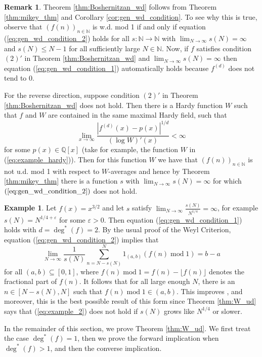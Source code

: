 \documentclass[12pt]{article}
\theoremstyle{plain} %
\theoremstyle{definition} %
\newtheorem{remark}[theorem]{Remark}
\newtheorem{example}[theorem]{Example}
\theoremstyle{plain}
\theoremstyle{plain}
\numberwithin{equation}{section}
\newcommand{\N}{\mathbb{N}}
\newcommand{\Q}{\mathbb{Q}}
\renewcommand{\epsilon}{\varepsilon}
\renewcommand{\leq}{\leqslant}
\renewcommand{\subset}{\subseteq}
\newcommand{\1}{\mathbbm{1}}
\newcommand{\oo}{\infty}
\renewcommand{\mod}{\operatorname{mod}}
\begin{document}
\begin{remark}
Theorem \ref{thm:Boshernitzan_wd} follows from Theorem \ref{thm:mikey_thm} and Corollary \ref{cor:gen_wd_condition}. To see why this is true, observe that  $(f(n))_{n\in \N}$ is w.d. mod 1 if and only if equation (\ref{eq:gen_wd_condition_2}) holds for all $s:\N\rightarrow \N$ with $\lim_{N\to\oo}s(N)=\oo$ and $s(N)\leq N-1$ for all sufficiently large $N\in \N$. Now, if $f$ satisfies condition $(2)'$ in Theorem \ref{thm:Boshernitzan_wd} and $\lim_{N\to\oo}s(N)=\oo$ then equation (\ref{eq:gen_wd_condition_1}) automatically holds because $f^{(d)}$ does not tend to $0$. 


For the reverse direction, suppose condition $(2)'$ in Theorem \ref{thm:Boshernitzan_wd} does not hold. Then there is a Hardy function $W$ such that $f$ and $W$ are contained in the same maximal Hardy field, such that 
\[
\lim_{x\to\oo}\frac{|f^{(d)}(x)-p(x)|^{1/d}}{(\log W)'(x)}<\oo
\]
for some $p(x)\in \Q[x]$ (take for example, the function $W$ in (\ref{eq:example_hardy})). Then for this function $W$ we have that $(f(n))_{n\in \N}$ is not u.d. mod 1 with respect to $W$-averages and hence by Theorem \ref{thm:mikey_thm} there is a function $s$ with $\lim_{N\to\oo}s(N)=\oo$ for which $(\ref{eq:gen_wd_condition_2})$ does not hold.
\end{remark}

\begin{example}
Let $f(x) = x^{3/2}$ and let $s$ satisfy $\lim_{N\to\oo}\frac{s(N)}{N^{1/4}}=\oo$, for example $s(N)=N^{1/4+\epsilon}$ for some $\epsilon>0$. Then equation (\ref{eq:gen_wd_condition_1}) holds with $d=\deg^*(f)=2$. By the usual proof of the Weyl Criterion, equation (\ref{eq:gen_wd_condition_2}) implies that 
\begin{equation}\label{eq:example_2}
         \lim_{N\to\oo}\frac{1}{s(N)}\sum_{n=N-s(N)}^N1_{(a,b)}(f(n)\mod 1) = b-a
\end{equation}
         for all $(a,b)\subset [0,1]$, where $f(n)\mod 1 = f(n)-\lfloor f(n)\rfloor$ denotes the fractional part of $f(n)$. It follows that for all large enough $N$, there is an $n\in [N-s(N),N]$ such that $f(n)\mod 1\in (a,b)$. This improves \cite[Example 1.10]{reilly26}, and  
         moreover, this is the best possible result of this form since Theorem \ref{thm:W_ud} says that (\ref{eq:example_2}) does not hold if $s(N)$ grows like $N^{1/4}$ or slower. 
\end{example}

In the remainder of this section, we prove Theorem \ref{thm:W_ud}. We first treat the case $\deg^*(f)=1$, then we prove the forward implication when $\deg^*(f)>1$, and then the converse implication.
\end{document}
